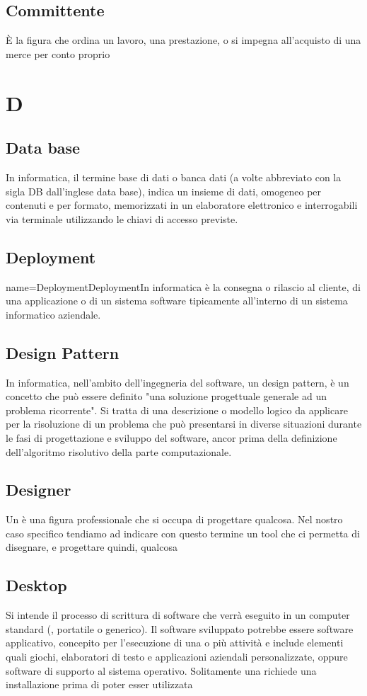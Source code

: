 {	    \subsection{Committente}
	    È la figura che ordina un lavoro, una prestazione, o si impegna all'acquisto di una merce per conto proprio


\section{D}
	\subsection{Data base}
	In informatica, il termine base di dati o banca dati (a volte abbreviato con la sigla DB dall'inglese data base), indica un insieme di dati, omogeneo per contenuti e per formato, memorizzati in un elaboratore elettronico e interrogabili via terminale utilizzando le chiavi di accesso previste.


		\subsection{Deployment}{name={DeploymentDeployment}In informatica è la consegna o rilascio al cliente, di una applicazione o di un sistema software tipicamente all'interno di un sistema informatico aziendale.


		\subsection{Design Pattern}
	In informatica, nell'ambito dell'ingegneria del software, un design pattern, è un concetto che può essere definito "una soluzione progettuale generale ad un problema ricorrente". Si tratta di una descrizione o modello logico da applicare per la risoluzione di un problema che può presentarsi in diverse situazioni durante le fasi di progettazione e sviluppo del software, ancor prima della definizione dell'algoritmo risolutivo della parte computazionale.

		\subsection{Designer}
		Un  è una figura professionale che si occupa di progettare qualcosa. Nel nostro caso specifico tendiamo ad indicare con questo termine un tool che ci permetta
di disegnare, e progettare quindi, qualcosa


	  \subsection{Desktop}
	  Si intende il processo di scrittura di software che verrà eseguito in un computer standard (, portatile o generico). Il software sviluppato potrebbe essere software applicativo, concepito per l'esecuzione di una o più attività e include elementi quali giochi, elaboratori di testo e applicazioni aziendali personalizzate, oppure software di supporto al sistema operativo. Solitamente una   richiede una installazione prima di poter esser utilizzata


}}
